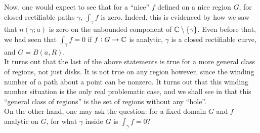 		Now, one would expect to see that for a ``nice'' $f$ defined on a nice region $G$, for closed rectifiable paths $\gamma$, $\int_\gamma f$ is zero. Indeed, this is evidenced by how we saw that $n(\gamma;a)$ is zero on the unbounded component of $\mathbb{C}\setminus\{\gamma\}$. Even before that, we had seen that $\int_\gamma f = 0$ if $f : G \to \mathbb{C}$ is analytic, $\gamma$ is a closed rectifiable curve, and $G = B(a,R)$.\\
		It turns out that the last of the above statements is true for a more general class of regions, not just disks. It is not true on any region however, since the winding number of a path about a point can be nonzero. It turns out that this winding number situation is the only real problematic case, and we shall see in  that this ``general class of regions'' is the set of regions without any ``hole''.\\
		On the other hand, one may ask the question: for a fixed domain $G$ and $f$ analytic on $G$, for what $\gamma$ inside $G$ is $\int_\gamma f = 0$?


